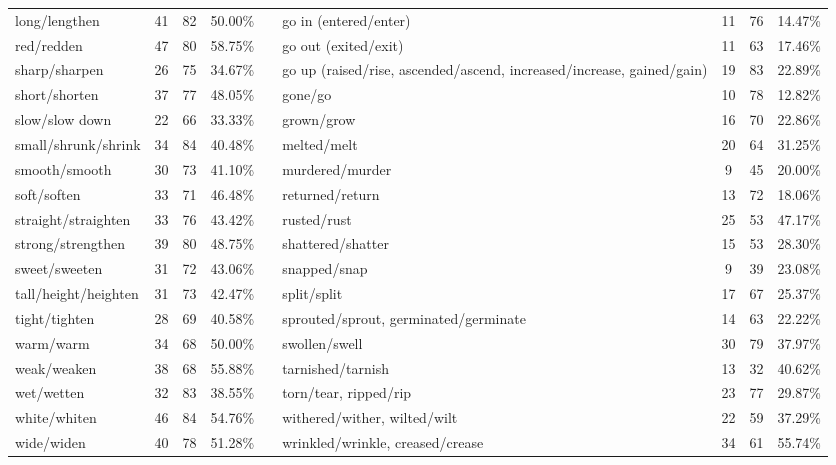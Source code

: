 \begin{tabular}{p{3cm}ccccp{3cm}ccc}
long/lengthen & 41 & 82 & 50.00\% & & go in (entered/enter) & 11 & 76 & 14.47\% \\
red/redden & 47 & 80 & 58.75\% & & go out (exited/exit) & 11 & 63 & 17.46\% \\
sharp/sharpen & 26 & 75 & 34.67\% & & go up (raised/rise, ascended/ascend, increased/increase, gained/gain) & 19 & 83 & 22.89\% \\
short/shorten & 37 & 77 & 48.05\% & & gone/go & 10 & 78 & 12.82\% \\
slow/slow down & 22 & 66 & 33.33\% & & grown/grow & 16 & 70 & 22.86\% \\
small/shrunk/shrink & 34 & 84 & 40.48\% & & melted/melt & 20 & 64 & 31.25\% \\
smooth/smooth & 30 & 73 & 41.10\% & & murdered/murder & 9 & 45 & 20.00\% \\
soft/soften & 33 & 71 & 46.48\% & & returned/return & 13 & 72 & 18.06\% \\
straight/straighten & 33 & 76 & 43.42\% & & rusted/rust & 25 & 53 & 47.17\% \\
strong/strengthen & 39 & 80 & 48.75\% & & shattered/shatter & 15 & 53 & 28.30\% \\
sweet/sweeten & 31 & 72 & 43.06\% & & snapped/snap & 9 & 39 & 23.08\% \\
tall/height/heighten & 31 & 73 & 42.47\% & & split/split & 17 & 67 & 25.37\% \\
tight/tighten & 28 & 69 & 40.58\% & & sprouted/sprout, germinated/germinate & 14 & 63 & 22.22\% \\
warm/warm & 34 & 68 & 50.00\% & & swollen/swell & 30 & 79 & 37.97\% \\
weak/weaken & 38 & 68 & 55.88\% & & tarnished/tarnish & 13 & 32 & 40.62\% \\
wet/wetten & 32 & 83 & 38.55\% & & torn/tear, ripped/rip & 23 & 77 & 29.87\% \\
white/whiten & 46 & 84 & 54.76\% & & withered/wither, wilted/wilt & 22 & 59 & 37.29\% \\
wide/widen & 40 & 78 & 51.28\% & & wrinkled/wrinkle, creased/crease & 34 & 61 & 55.74\%
\end{tabular}